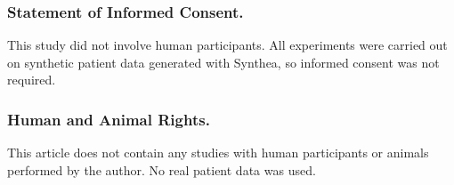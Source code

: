 \documentclass[runningheads]{llncs}
\begin{document}
\subsubsection*{Statement of Informed Consent.}
This study did not involve human participants. All experiments were carried out on synthetic patient data generated with Synthea, so informed consent was not required.

\subsubsection*{Human and Animal Rights.}
This article does not contain any studies with human participants or animals performed by the author. No real patient data was used.



\end{document}
